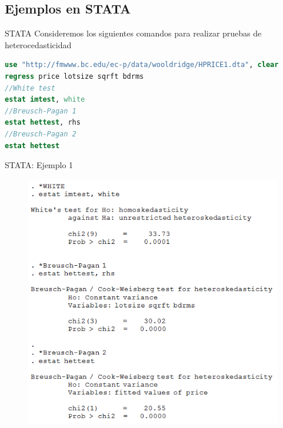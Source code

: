 \subsection{Ejemplos en STATA}
\begin{frame}[fragile]{STATA}
	Consideremos los siguientes comandos para realizar pruebas de heterocedasticidad
	{\small
\begin{lstlisting}[language=Stata, numbers=none]
use "http://fmwww.bc.edu/ec-p/data/wooldridge/HPRICE1.dta", clear
regress price lotsize sqrft bdrms
//White test
estat imtest, white
//Breusch-Pagan 1
estat hettest, rhs
//Breusch-Pagan 2
estat hettest
\end{lstlisting}
}
\end{frame}
\begin{frame}{STATA: Ejemplo 1}
	\begin{figure}
		\centering
		\includegraphics[scale=.37]{fig/stata1.png}
	\end{figure}
\end{frame}
